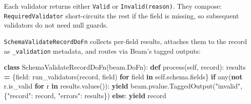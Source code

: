 \documentclass[
  11pt,
  british,
  oneside]{book}
\newenvironment{Shaded}{\begin{snugshade}}{\end{snugshade}}
\newcommand{\BuiltInTok}[1]{#1}
\newcommand{\ControlFlowTok}[1]{\textcolor[rgb]{0.13,0.29,0.53}{\textbf{#1}}}
\newcommand{\ImportTok}[1]{#1}
\newcommand{\KeywordTok}[1]{\textcolor[rgb]{0.13,0.29,0.53}{\textbf{#1}}}
\newcommand{\NormalTok}[1]{#1}
\newcommand{\OperatorTok}[1]{\textcolor[rgb]{0.81,0.36,0.00}{\textbf{#1}}}
\newcommand{\SpecialCharTok}[1]{\textcolor[rgb]{0.00,0.00,0.00}{#1}}
\newcommand{\StringTok}[1]{\textcolor[rgb]{0.31,0.60,0.02}{#1}}
\newcommand{\VariableTok}[1]{\textcolor[rgb]{0.00,0.00,0.00}{#1}}
\newcommand{\VerbatimStringTok}[1]{\textcolor[rgb]{0.31,0.60,0.02}{#1}}
\begin{document}
\begin{Shaded}
\end{Shaded}

Each validator returns either \texttt{Valid} or
\texttt{Invalid(reason)}. They compose: \texttt{RequiredValidator}
short-circuits the rest if the field is missing, so subsequent
validators do not need null guards.

\texttt{SchemaValidateRecordDoFn} collects per-field results, attaches
them to the record as \texttt{\_validation} metadata, and routes via
Beam's tagged outputs:

\begin{Shaded}
\begin{Highlighting}[]
\KeywordTok{class}\NormalTok{ SchemaValidateRecordDoFn(beam.DoFn):}
    \KeywordTok{def}\NormalTok{ process(}\VariableTok{self}\NormalTok{, record):}
\NormalTok{        results }\OperatorTok{=}\NormalTok{ \{field: run\_validators(record, field) }\ControlFlowTok{for}\NormalTok{ field }\KeywordTok{in} \VariableTok{self}\NormalTok{.schema.fields\}}
        \ControlFlowTok{if} \BuiltInTok{any}\NormalTok{(}\KeywordTok{not}\NormalTok{ r.is\_valid }\ControlFlowTok{for}\NormalTok{ r }\KeywordTok{in}\NormalTok{ results.values()):}
            \ControlFlowTok{yield}\NormalTok{ beam.pvalue.TaggedOutput(}\StringTok{"invalid"}\NormalTok{, \{}\StringTok{"record"}\NormalTok{: record, }\StringTok{"errors"}\NormalTok{: results\})}
        \ControlFlowTok{else}\NormalTok{:}
            \ControlFlowTok{yield}\NormalTok{ record}
\end{Highlighting}
\end{Shaded}
\end{document}
